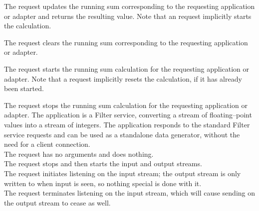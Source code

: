 The  request updates the running sum
corresponding to the requesting application or adapter and returns the resulting value.
Note that an  request implicitly starts the
calculation.\\
%

The  request clears the running sum
corresponding to the requesting application or adapter.\\
%

The  request starts the running sum
calculation for the requesting application or adapter.
Note that a  request implicitly resets the
calculation, if it has already been started.\\
%

The  request stops the running sum
calculation for the requesting application or adapter.
%
The  application is a Filter
service, converting a stream of floating--point values into a stream of integers.
The application responds to the standard Filter service requests and can be used as a
standalone data generator, without the need for a client connection.\\

The  request has no arguments and
does nothing.\\

The  request stops and then
starts the input and output streams.\\

The  request initiates listening
on the input stream; the output stream is only written to when input is seen, so nothing
special is done with it.\\

The  request terminates listening
on the input stream, which will cause sending on the output stream to cease as well.\\

